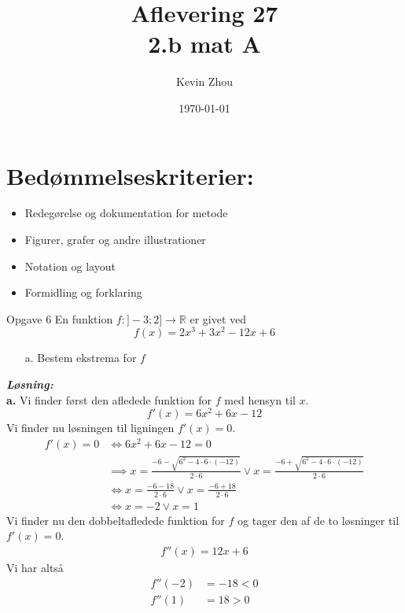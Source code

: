 \documentclass{article}
\title{Aflevering 27\\
{\Large \textbf{2.b mat A}}}
\author{Kevin Zhou}
\date{\today}
\newcommand{\sol}{\setlength{\parindent}{0cm}\textbf{\textit{Løsning:}}\setlength{\parindent}{1cm}}
\begin{document}
\maketitle
\section*{Bedømmelseskriterier:}
\begin{itemize}
    \setlength\itemsep{3cm}
    \Large
    \item  Redegørelse og dokumentation for metode
    \item Figurer, grafer og andre illustrationer
    \item Notation og layout
    \item Formidling og forklaring
\end{itemize}
\pagebreak
\begin{question}{Opgave 6}{}
  En funktion $f:]-3;2] \to \mathbb{R}$ er givet ved
  \[
  f(x)= 2x^3+3x^2-12x+6
  \] 
  \begin{itemize}
    \item[a.] Bestem ekstrema for $f$
  \end{itemize}
\end{question}
\sol \\
\textbf{a.}
Vi finder først den afledede funktion for $f$ med hensyn til $x$.
\[
f'(x)=6x^2+6x-12
\] 
Vi finder nu løsningen til ligningen $f'(x)=0$.
\begin{equation*}
\begin{split}
  f'(x)=0 &\iff 6x^2+6x-12=0 \\
  &\implies x=\frac{-6-\sqrt{6^2-4 \cdot 6 \cdot (-12)} }{2 \cdot 6} \lor x=\frac{-6+\sqrt{6^2-4 \cdot 6 \cdot (-12)} }{2 \cdot 6}\\ 
  &\iff x=\frac{-6-18}{2 \cdot 6} \lor x=\frac{-6+18}{2 \cdot 6}\\ 
  &\iff x=-2 \lor x=1
\end{split}
\end{equation*}
Vi finder nu den dobbeltafledede funktion for $f$ og tager den af de to løsninger til $f'(x)=0$.
\begin{equation*}
\begin{split}
  f''(x)=12x+6 
\end{split}
\end{equation*}
Vi har altså
\begin{equation*}
\begin{split}
  f''(-2)&=-18<0\\ 
  f''(1)&=18>0
\end{split}
\end{equation*}
\end{document}
